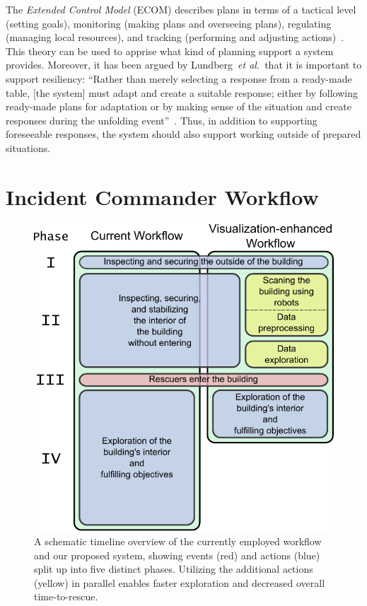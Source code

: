 \documentclass{egpubl}
\def\etal{\textit{et al.}}
\begin{document}
The \emph{Extended Control Model} (ECOM) describes plans in terms of a tactical level (setting goals), monitoring (making plans and overseeing plans), regulating (managing local resources), and tracking (performing and adjusting actions)~\cite{hollnagel2005joint}. This theory can be used to apprise what kind of planning support a system provides.  Moreover, it has been argued by Lundberg~\etal\ that it is important to support resiliency: ``Rather than merely selecting a response from a ready-made table, [the system] must adapt and create a suitable response; either by following ready-made plans for adaptation or by making sense of the situation and create responses during the unfolding event''~\cite{Lundberg2012}. Thus, in addition to supporting foreseeable responses, the system should also support working outside of prepared situations.


\section{Incident Commander Workflow} \label{sec:workflow}

\begin{figure}
	\centering
	\includegraphics[height=0.8125\columnwidth]{figures/workflow.pdf}
	\caption{A schematic timeline overview of the currently employed workflow and our proposed system, showing events (red) and actions (blue) split up into five distinct phases. Utilizing the additional actions (yellow) in parallel enables faster exploration and decreased overall time-to-rescue.}
	\label{fig:workflow:workflow}
\end{figure}
\end{document}
